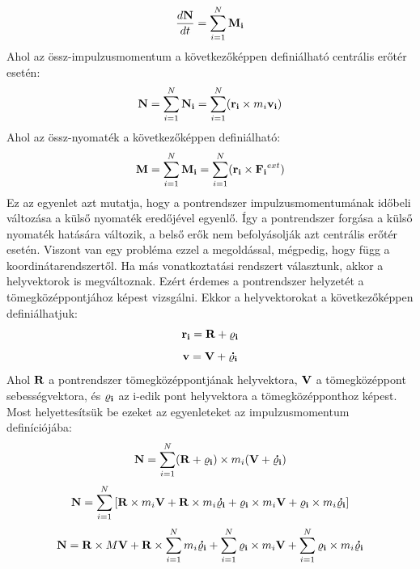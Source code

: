 \documentclass[../main.tex]{subfiles}
\begin{document}
\begin{equation}
    \frac{d\bold{N}}{dt} = \sum_{i=1}^{N} \bold{M_i}
\end{equation}
Ahol az össz-impulzusmomentum a következőképpen definiálható centrális erőtér esetén:
\begin{equation}
    \bold{N} = \sum_{i=1}^{N} \bold{N_i} = \sum_{i=1}^{N} (\bold{r_i} \times m_i \bold{v_i})
\end{equation}
Ahol az össz-nyomaték a következőképpen definiálható:
\begin{equation}
    \bold{M} = \sum_{i=1}^{N} \bold{M_i} = \sum_{i=1}^{N} (\bold{r_i} \times \bold{F_i}^{ext})
\end{equation}
Ez az egyenlet azt mutatja, hogy a pontrendszer impulzusmomentumának időbeli változása a külső nyomaték eredőjével egyenlő. Így a pontrendszer forgása a külső nyomaték hatására változik,
a belső erők nem befolyásolják azt centrális erőtér esetén. Viszont van egy probléma ezzel a megoldással, mégpedig, hogy függ a koordinátarendszertől. Ha más vonatkoztatási rendszert választunk,
akkor a helyvektorok is megváltoznak. Ezért érdemes a pontrendszer helyzetét a tömegközéppontjához képest vizsgálni. Ekkor a helyvektorokat a következőképpen definiálhatjuk:
\begin{equation}
    \bold{r_i} = \bold{R} + \bold{\varrho_i}
\end{equation}
\begin{equation}
    \bold{v} = \bold{V} + \bold{\dot{\varrho_i}}
\end{equation}
Ahol $\bold{R}$ a pontrendszer tömegközéppontjának helyvektora, $\bold{V}$ a tömegközéppont sebességvektora, és $\bold{\varrho_i}$ az i-edik pont helyvektora a tömegközépponthoz képest.
Most helyettesítsük be ezeket az egyenleteket az impulzusmomentum definíciójába:
\begin{equation}
    \bold{N} = \sum_{i=1}^{N} (\bold{R} + \bold{\varrho_i}) \times m_i (\bold{V} + \bold{\dot{\varrho_i}})
\end{equation}
\begin{equation}
    \bold{N} = \sum_{i=1}^{N} \left[\bold{R} \times m_i \bold{V} + \bold{R} \times m_i \bold{\dot{\varrho_i}} + \bold{\varrho_i} \times m_i \bold{V} + \bold{\varrho_i} \times m_i \bold{\dot{\varrho_i}}\right]
\end{equation}
\begin{equation}
    \bold{N} = \bold{R} \times M \bold{V} + \bold{R} \times \sum_{i=1}^{N} m_i \bold{\dot{\varrho_i}} + \sum_{i=1}^{N} \bold{\varrho_i} \times m_i \bold{V} + \sum_{i=1}^{N} \bold{\varrho_i} \times m_i \bold{\dot{\varrho_i}}
\end{equation}
\end{document}
